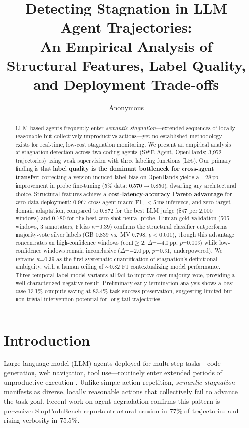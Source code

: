\documentclass[11pt,a4paper]{article}
\title{Detecting Stagnation in LLM Agent Trajectories:\\An Empirical Analysis of Structural Features, Label Quality,\\and Deployment Trade-offs}
\author{Anonymous}
\begin{document}
\maketitle

\begin{abstract}
LLM-based agents frequently enter \emph{semantic stagnation}---extended sequences of locally reasonable but collectively unproductive actions---yet no established methodology exists for real-time, low-cost stagnation monitoring.
We present an empirical analysis of stagnation detection across two coding agents (SWE-Agent, OpenHands; 3{,}952 trajectories) using weak supervision with three labeling functions (LFs).
Our primary finding is that \textbf{label quality is the dominant bottleneck for cross-agent transfer}: correcting a version-induced label bias on OpenHands yields a +28\,pp improvement in probe fine-tuning (5\% data: 0.570$\to$0.850), dwarfing any architectural choice.
Structural features achieve a \textbf{cost-latency-accuracy Pareto advantage} for zero-data deployment: 0.967 cross-agent macro F1, $<$5\,ms inference, and zero target-domain adaptation, compared to 0.872 for the best LLM judge (\$47 per 2{,}000 windows) and 0.780 for the best zero-shot neural probe.
Human gold validation (505 windows, 3 annotators, Fleiss $\kappa$=0.39) confirms the structural classifier outperforms majority-vote silver labels (GB 0.839 vs.\ MV 0.798, $p<0.001$), though this advantage concentrates on high-confidence windows (conf$\geq$2: $\Delta$=+4.0\,pp, $p$=0.003) while low-confidence windows remain inconclusive ($\Delta$=$-$2.0\,pp, $p$=0.31, underpowered).
We reframe $\kappa$=0.39 as the first systematic quantification of stagnation's definitional ambiguity, with a human ceiling of $\sim$0.82 F1 contextualizing model performance.
Three temporal label model variants all fail to improve over majority vote, providing a well-characterized negative result.
Preliminary early termination analysis shows a best-case 13.1\% compute saving at 83.4\% task-success preservation, suggesting limited but non-trivial intervention potential for long-tail trajectories.
\end{abstract}

\section{Introduction}

Large language model (LLM) agents deployed for multi-step tasks---code generation, web navigation, tool use---routinely enter extended periods of unproductive execution \cite{jimenez2024swebench,wang2024opendevin}.
Unlike simple action repetition, \emph{semantic stagnation} manifests as diverse, locally reasonable actions that collectively fail to advance the task goal.
Recent work on agent degradation confirms this pattern is pervasive: SlopCodeBench \cite{slopcodebench2026} reports structural erosion in 77\% of trajectories and rising verbosity in 75.5\%.
\end{document}
